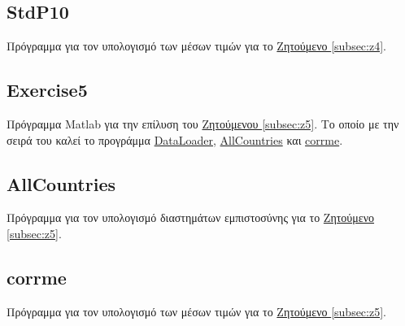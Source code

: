 \documentclass[11pt]{scrartcl} %
\begin{document}
\subsection{StdP10}
\label{prog:StdP10}
Πρόγραμμα για τον υπολογισμό των μέσων τιμών για το \hyperref[subsec:z4]{Ζητούμενο \ref*{subsec:z4}}.

	
	
	
\subsection{Exercise5}
\label{prog:5}
Πρόγραμμα Matlab για την επίλυση του \hyperref[subsec:z5]{Ζητούμενου \ref*{subsec:z5}}. Το οποίο με την σειρά του καλεί το προγράμμα \hyperref[prog:DataLoader]{DataLoader}, \hyperref[prog:AllCountries]{AllCountries} και \hyperref[prog:corrme]{corrme}.


\subsection{AllCountries}
\label{prog:AllCountries}
Πρόγραμμα για τον υπολογισμό διαστημάτων εμπιστοσύνης για το \hyperref[subsec:z5]{Ζητούμενο \ref*{subsec:z5}}.


\subsection{corrme}
\label{prog:corrme}
Πρόγραμμα για τον υπολογισμό των μέσων τιμών για το \hyperref[subsec:z5]{Ζητούμενο \ref*{subsec:z5}}.
	
	
\end{document}
